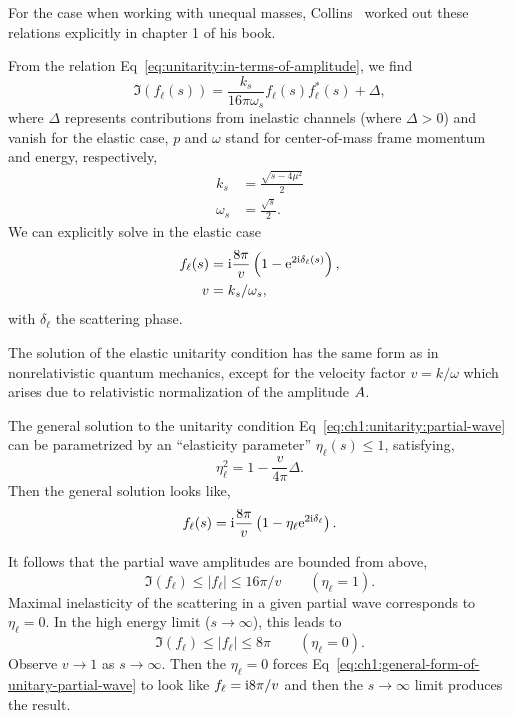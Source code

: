  For the case when working with unequal masses, Collins~\cite{Collins:1977jy}
worked out these relations explicitly in chapter 1 of his book.

\M[-1] From the relation Eq~\eqref{eq:unitarity:in-terms-of-amplitude},
we find
\begin{equation}\label{eq:ch1:unitarity:partial-wave}
\Im(f_{\ell}(s)) = \frac{k_{s}}{16\pi\omega_{s}} f_{\ell}(s)f^{*}_{\ell}(s) + \Delta,
\end{equation}
where $\Delta$ represents contributions from inelastic channels (where
$\Delta>0$) and vanish for the elastic case, $p$ and $\omega$ stand for
center-of-mass frame momentum and energy, respectively,
\begin{subequations}
  \begin{align}
    k_{s} &= \frac{\sqrt{s-4\mu^{2}}}{2}\\
    \omega_{s} &= \frac{\sqrt{s}}{2}.
  \end{align}
\end{subequations}
We can explicitly solve in the elastic case
\begin{subequations}
  \begin{align}
    f_{\ell}(s)&=\mathrm{i}\frac{8\pi}{v}\left(1 - \mathrm{e}^{2\mathrm{i}\delta_{\ell}(s)}\right),\\
    v &= k_{s}/\omega_{s},
  \end{align}
\end{subequations}
with $\delta_{\ell}$ the scattering phase.

The solution of the elastic unitarity condition has the same form as in
nonrelativistic quantum mechanics, except for the velocity factor
$v=k/\omega$ which arises due to relativistic normalization of the
amplitude $A$.

The general solution to the unitarity condition
Eq~\eqref{eq:ch1:unitarity:partial-wave} can be parametrized by an
``elasticity parameter'' $\eta_{\ell}(s)\leq 1$, satisfying,
\begin{equation}
\eta_{\ell}^{2} = 1 - \frac{v}{4\pi}\Delta.
\end{equation}
Then the general solution looks like,
\begin{equation}\label{eq:ch1:general-form-of-unitary-partial-wave}
f_{\ell}(s) = \mathrm{i}\frac{8\pi}{v}\left(1 - \eta_{\ell}\mathrm{e}^{2\mathrm{i}\delta_{\ell}}\right).
\end{equation}

It follows that the partial wave amplitudes are bounded from above,
\begin{equation}
\Im(f_{\ell})\leq|f_{\ell}|\leq 16\pi/v\qquad(\eta_{\ell}=1).
\end{equation}
Maximal inelasticity of the scattering in a given partial wave
corresponds to $\eta_{\ell}=0$. In the high energy limit ($s\to\infty$),
this leads to
\begin{equation}
\Im(f_{\ell})\leq|f_{\ell}|\leq 8\pi\qquad(\eta_{\ell}=0).
\end{equation}
Observe $v\to1$ as $s\to\infty$. Then the $\eta_{\ell}=0$ forces Eq~\eqref{eq:ch1:general-form-of-unitary-partial-wave}
to look like $f_{\ell} = \mathrm{i} 8\pi/v$ and then the $s\to\infty$ limit
produces the result.

